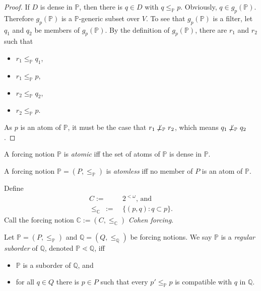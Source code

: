 \documentclass[12pt]{article}
\numberwithin{equation}{section}
\begin{document}
\begin{proof}
If $D$ is dense in $\mathbb{P}$, then there is $q \in D$ with $q \leq_{\mathbb{P}} p$. Obviously, $q \in g_p (\mathbb{P})$. Therefore $g_p (\mathbb{P})$ is a $\mathbb{P}$-generic subset over $V$. To see that $g_p (\mathbb{P})$ is a filter, let $q_1$ and $q_2$ be members of $g_p (\mathbb{P})$. By the definition of $g_p (\mathbb{P})$, there are $r_1$ and $r_2$ such that 
\begin{itemize}
    \item $r_1 \leq_{\mathbb{P}} q_1$, 
    \item $r_1 \leq_{\mathbb{P}} p$,
    \item $r_2 \leq_{\mathbb{P}} q_2$,
    \item $r_2 \leq_{\mathbb{P}} p$.
\end{itemize}
As $p$ is an atom of $\mathbb{P}$, it must be the case that $r_1 \not \! \! \bot_{\mathbb{P}} \ r_2$, which means $q_1 \not \! \! \bot_{\mathbb{P}} \ q_2$.
\end{proof}

\begin{defi}
A forcing notion $\mathbb{P}$ is \emph{atomic} iff the set of atoms of $\mathbb{P}$ is dense in $\mathbb{P}$.
\end{defi}

\begin{defi}
A forcing notion $\mathbb{P} = (P, \leq_{\mathbb{P}})$ is \emph{atomless} iff no member of $P$ is an atom of $\mathbb{P}$.
\end{defi}

\begin{defi}
Define
\begin{align*}
    C := \ & 2^{< \omega} \text{, and} \\
    \leq_{\mathbb{C}} \ := \ & \{(p, q) : q \subset p\} \text{.}
\end{align*}
Call the forcing notion $\mathbb{C} := (C, \leq_{\mathbb{C}})$ \emph{Cohen forcing}.
\end{defi}

\begin{defi}
Let $\mathbb{P} = (P, \leq_{\mathbb{P}})$ and $\mathbb{Q} = (Q, \leq_{\mathbb{Q}})$ be forcing notions. We say $\mathbb{P}$ is a \emph{regular suborder} of $\mathbb{Q}$, denoted $\mathbb{P} \lessdot \mathbb{Q}$, iff 
\begin{itemize}
    \item $\mathbb{P}$ is a suborder of $\mathbb{Q}$, and
    \item for all $q \in Q$ there is $p \in P$ such that every $p' \leq_{\mathbb{P}} p$ is compatible with $q$ in $\mathbb{Q}$.
\end{itemize}
\end{defi}
\end{document}
